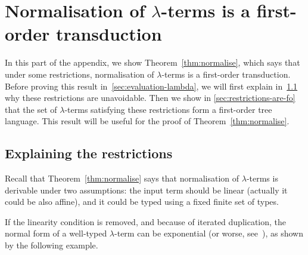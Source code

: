 \section{Normalisation of $\lambda$-terms is a first-order transduction}
\label{sec:eval}

\newcommand{\lambdaterm}{$\lambda$-term }
\newcommand{\lambdaterms}{$\lambda$-terms }

\newcommand{\NonLinTerms}[2]{\Lambda_{#1} #2}
\newcommand{\LinTerms}[2]{\mathsf{Lin}_{#1} #2}

 \newcommand{\rlambda}{\ranked{\Lambda}}
 \newcommand{\rlambdalin}{\ranked{\Lambda^{\sf{lin}}}}
 \newcommand{\rlambdathin}{\ranked{\Lambda^{\sf{thin}}}}


\newcommand{\thinterm}[1]{\ranked{\mathsf{Thin}_{#1}}}

In this part of the appendix, we show Theorem~\ref{thm:normalise}, which says that under some restrictions, normalisation of $\lambda$-terms is a first-order transduction. Before proving this result in~\ref{sec:evaluation-lambda}, we will first explain in~\ref{sec:explaining-restrictions} why these restrictions are unavoidable. Then we show in \ref{sec:restrictions-are-fo} that the set of $\lambda$-terms satisfying these restrictions form a first-order tree language. This result will be useful for the proof of Theorem~\ref{thm:normalise}.



\subsection{Explaining the restrictions}\label{sec:explaining-restrictions}

Recall that Theorem~\ref{thm:normalise} says that normalisation of $\lambda$-terms is derivable under two assumptions:
the input term should be linear (actually it could be also affine),  and it could be typed using a fixed finite set of types. 

If the linearity condition is removed, and because of iterated duplication, the normal form of a well-typed $\lambda$-term can be exponential (or worse, see~\cite[Section 3.6]{sorensen_lectures_2006}), as shown by the following example.
 
